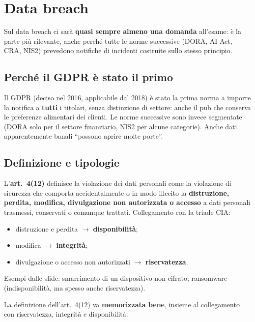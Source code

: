 \section{Data breach}

\begin{esame}
Sul data breach ci sarà \textbf{quasi sempre almeno una domanda} all'esame: è la parte più rilevante,
anche perché tutte le norme successive (DORA, AI Act, CRA, NIS2) prevedono notifiche di incidenti
costruite sullo stesso principio.
\end{esame}

\subsection{Perché il GDPR è stato il primo}
Il GDPR (deciso nel 2016, applicabile dal 2018) è stato la prima norma a imporre la notifica a
\textbf{tutti} i titolari, senza distinzione di settore: anche il pub che conserva le preferenze
alimentari dei clienti. Le norme successive sono invece segmentate (DORA solo per il settore
finanziario, NIS2 per alcune categorie). Anche dati apparentemente banali ``possono aprire molte
porte''.

\subsection{Definizione e tipologie}
L'\textbf{art.~4(12)} definisce la violazione dei dati personali come la violazione di sicurezza che
comporta accidentalmente o in modo illecito la \textbf{distruzione, perdita, modifica, divulgazione
non autorizzata o accesso} a dati personali trasmessi, conservati o comunque trattati.
Collegamento con la triade CIA:
\begin{itemize}
  \item distruzione e perdita $\rightarrow$ \textbf{disponibilità};
  \item modifica $\rightarrow$ \textbf{integrità};
  \item divulgazione o accesso non autorizzati $\rightarrow$ \textbf{riservatezza}.
\end{itemize}
Esempi dalle slide: smarrimento di un dispositivo non cifrato; ransomware (indisponibilità, ma spesso
anche riservatezza).

\begin{esame}
La definizione dell'art.~4(12) va \textbf{memorizzata bene}, insieme al collegamento con riservatezza,
integrità e disponibilità.
\end{esame}

